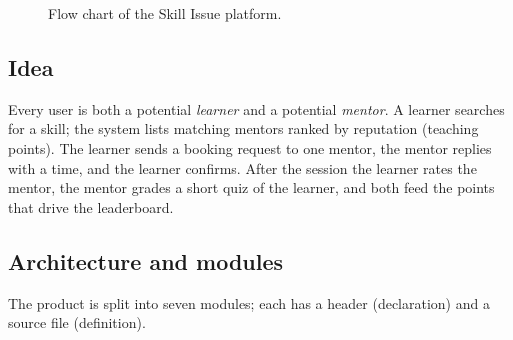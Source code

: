 \documentclass[11pt,a4paper]{article}
\begin{document}
\begin{figure}[p]
{}
\caption{Flow chart of the Skill Issue platform.}\label{fig:flow}
\end{figure}

\subsection{Idea}

Every user is both a potential \emph{learner} and a potential \emph{mentor}. A learner searches for a skill; the system lists matching mentors ranked by reputation (teaching points). The learner sends a booking request to one mentor, the mentor replies with a time, and the learner confirms. After the session the learner rates the mentor, the mentor grades a short quiz of the learner, and both feed the points that drive the leaderboard.

\subsection{Architecture and modules}

The product is split into seven modules; each has a header (declaration) and a source file (definition).
\end{document}
